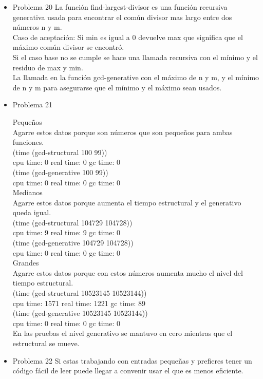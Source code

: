 \documentclass{article}
\begin{document}
\begin{itemize}
    \item Problema 20
    La función find-largest-divisor es una función recursiva generativa usada para encontrar el común divisor mas largo entre dos números n y m. \\
    Caso de aceptación: Si min es igual a 0 devuelve max que significa que el máximo común divisor se encontró. \\
    Si el caso base no se cumple se hace una llamada recursiva con el mínimo y el residuo de max y min. \\
    La llamada en la función gcd-generative con el máximo de n y m, y el mínimo de n y m para asegurarse que el mínimo y el máximo sean usados. \\

    \item Problema 21
    
    Pequeños \\
    Agarre estos datos porque son números que son pequeños para ambas funciones.\\
    (time (gcd-structural 100 99)) \\
    cpu time: 0 real time: 0 gc time: 0 \\
    (time (gcd-generative 100 99)) \\
    cpu time: 0 real time: 0 gc time: 0 \\
    
    Medianos \\
    Agarre estos datos porque aumenta el tiempo estructural y el generativo queda igual.\\
    (time (gcd-structural 104729 104728)) \\
    cpu time: 9 real time: 9 gc time: 0 \\
    (time (gcd-generative 104729 104728)) \\
    cpu time: 0 real time: 0 gc time: 0 \\
    
    Grandes \\
    Agarre estos datos porque con estos números aumenta mucho el nivel del tiempo estructural.\\
    (time (gcd-structural 10523145 10523144)) \\
    cpu time: 1571 real time: 1221 gc time: 89 \\
    (time (gcd-generative 10523145 10523144)) \\
    cpu time: 0 real time: 0 gc time: 0 \\

    En las pruebas el nivel generativo se mantuvo en cero mientras que el estructural se mueve.
    \item Problema 22
    Si estas trabajando con entradas pequeñas y prefieres tener un código fácil de leer puede llegar a convenir usar el que es menos eficiente. \\

\end{itemize}
\end{document}
